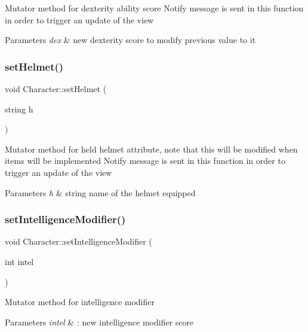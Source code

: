 Mutator method for dexterity ability score Notify message is sent in this function in order to trigger an update of the view 
\begin{DoxyParams}{Parameters}
{\em dex} & new dexterity score to modify previous value to it \\
\hline
\end{DoxyParams}
\hypertarget{class_character_a2e88779e8d7d6b1e9237c003b8b13d03}{}\label{class_character_a2e88779e8d7d6b1e9237c003b8b13d03} 
\subsubsection{\texorpdfstring{set\+Helmet()}{setHelmet()}}
{\footnotesize\ttfamily void Character\+::set\+Helmet (\begin{DoxyParamCaption}\item[{string}]{h }\end{DoxyParamCaption})}

Mutator method for held helmet attribute, note that this will be modified when items will be implemented Notify message is sent in this function in order to trigger an update of the view 
\begin{DoxyParams}{Parameters}
{\em h} & string name of the helmet equipped \\
\hline
\end{DoxyParams}
\hypertarget{class_character_a554260d3ec37497bbdc7f1a22ddd7c78}{}\label{class_character_a554260d3ec37497bbdc7f1a22ddd7c78} 
\subsubsection{\texorpdfstring{set\+Intelligence\+Modifier()}{setIntelligenceModifier()}}
{\footnotesize\ttfamily void Character\+::set\+Intelligence\+Modifier (\begin{DoxyParamCaption}\item[{int}]{intel }\end{DoxyParamCaption})}

Mutator method for intelligence modifier 
\begin{DoxyParams}{Parameters}
{\em intel} & \+: new intelligence modifier score \\
\hline
\end{DoxyParams}
\hypertarget{class_character_a34f038f813b6b1522f41ba04f4620628}{}\label{class_character_a34f038f813b6b1522f41ba04f4620628} 
